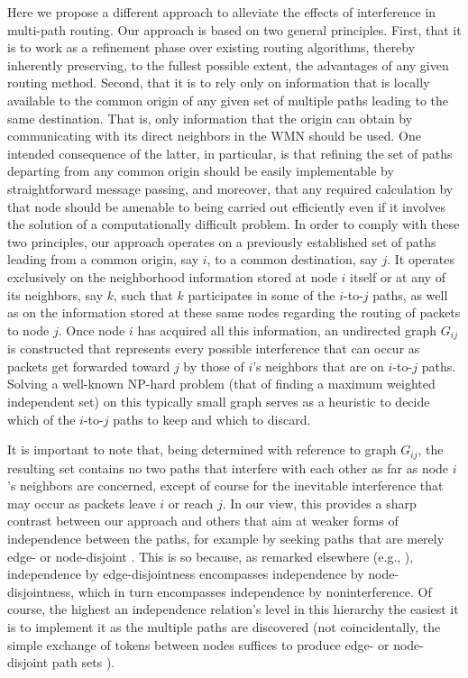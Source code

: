\documentclass{article}
\begin{document}
Here we propose a different approach to alleviate the effects of interference in
multi-path routing. Our approach is based on two general principles. First, that
it is to work as a refinement phase over existing routing algorithms, thereby
inherently preserving, to the fullest possible extent, the advantages of any
given routing method. Second, that it is to rely only on information that is
locally available to the common origin of any given set of multiple paths
leading to the same destination. That is, only information that the origin can
obtain by communicating with its direct neighbors in the WMN should be used. One
intended consequence of the latter, in particular, is that refining the set of
paths departing from any common origin should be easily implementable by
straightforward message passing, and moreover, that any required calculation by
that node should be amenable to being carried out efficiently even if it
involves the solution of a computationally difficult problem. In order to comply
with these two principles, our approach operates on a previously established set
of paths leading from a common origin, say $i$, to a common destination, say
$j$. It operates exclusively on the neighborhood information stored at node $i$
itself or at any of its neighbors, say $k$, such that $k$ participates in some
of the $i$-to-$j$ paths, as well as on the information stored at these same
nodes regarding the routing of packets to node $j$. Once node $i$ has acquired
all this information, an undirected graph $G_{ij}$ is constructed that
represents every possible interference that can occur as packets get forwarded
toward $j$ by those of $i$'s neighbors that are on $i$-to-$j$ paths. Solving a
well-known NP-hard problem (that of finding a maximum weighted independent set)
on this typically small graph serves as a heuristic to decide which of the
$i$-to-$j$ paths to keep and which to discard.

It is important to note that, being determined with reference to graph $G_{ij}$,
the resulting set contains no two paths that interfere with each other as far as
node $i$'s neighbors are concerned, except of course for the inevitable
interference that may occur as packets leave $i$ or reach $j$. In our view, this
provides a sharp contrast between our approach and others that aim at weaker
forms of independence between the paths, for example by seeking paths that are
merely edge- or node-disjoint
\cite{Lee2001,Sung2001,Tsirigos2001,Cruz2003,Alicherry2006,Sheriff2006,Wang2006,Xiaojun2007,Wang2008,Wang2009}.
This is so because, as remarked elsewhere (e.g., \cite{Pearlman2000}),
independence by edge-disjointness encompasses independence by node-disjointness,
which in turn encompasses independence by noninterference. Of course, the
highest an independence relation's level in this hierarchy the easiest it is to
implement it as the multiple paths are discovered (not coincidentally, the
simple exchange of tokens between nodes suffices to produce edge- or
node-disjoint path sets \cite{Xuefei2004}).
\end{document}
